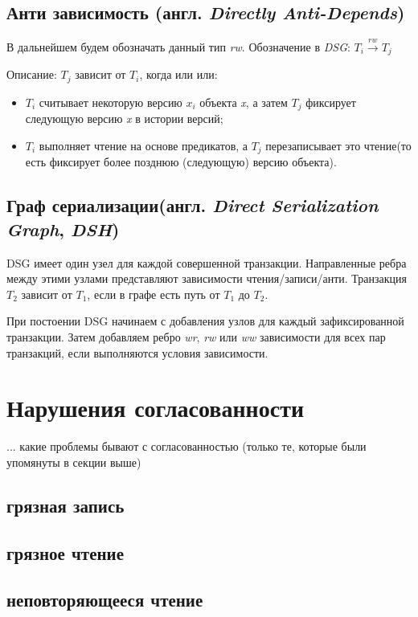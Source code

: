\documentclass[12pt,  openany]{book}
\begin{document}
\subsection{Анти зависимость (англ. \textit{Directly Anti-Depends})}
В дальнейшем будем обозначать данный тип \textit{rw}. Обозначение в \textit{DSG}: $T_i  \xrightarrow{\textit{rw}} T_j$
\par
Описание: $T_j$ зависит от $T_i$,  когда или или:
\begin{itemize}
\item $T_i$ считывает некоторую версию $x_i$ объекта \textit{x}, а затем $T_j$  фиксирует следующую версию \textit{x} в истории версий;
\item $T_i$ выполняет чтение на основе предикатов, а $T_j$ перезаписывает это чтение(то есть фиксирует более позднюю (следующую) версию  объекта).
\end{itemize}

\subsection{Граф сериализации(англ. \textit{Direct Serialization Graph}, \textit{DSH})}
DSG имеет один узел для каждой совершенной транзакции. Направленные ребра между этими узлами представляют зависимости чтения/записи/анти. Транзакция $T_2$ зависит от $T_1$, если в графе есть путь от $T_1$ до $T_2$. 
\par
При постоении DSG начинаем  с добавления узлов для каждый зафиксированной транзакции. Затем добавляем ребро \textit{wr}, \textit{rw} или \textit{ww} зависимости для всех пар транзакций, если выполняются условия зависимости.

\section{Нарушения согласованности}
... какие проблемы бывают с согласованностью
(только те, которые были упомянуты в секции выше)

\subsection{грязная запись}
\subsection{грязное чтение}
\subsection{неповторяющееся чтение}
\end{document}
